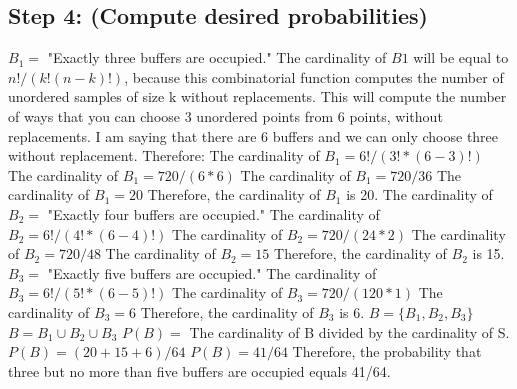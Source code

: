 \documentclass[a4paper,10pt]{article}
\begin{document}
\subsection{Step 4: (Compute desired probabilities)}
$ B_{1} = $ "Exactly three buffers are occupied." \newline
The cardinality of $ B{1} $ will be equal to $ n!/(k!(n-k)!) $, because this combinatorial function computes the 
number 
of unordered samples of size k without replacements. This will compute the number of ways that you can choose 3 
unordered points from 6 points, without replacements. I am saying that there are 6 buffers and we can only 
choose three without replacement. Therefore: \newline
The cardinality of $ B_{1} = 6!/(3!*(6-3)!) $ \newline
The cardinality of $ B_{1} = 720/(6*6) $ \newline
The cardinality of $ B_{1} = 720/36 $ \newline
The cardinality of $ B_{1} = 20 $ \newline
Therefore, the cardinality of $ B_{1} $ is 20. \newline \newline
The cardinality of $ B_{2} = $ "Exactly four buffers are occupied." \newline
The cardinality of $ B_{2} = 6!/(4!*(6-4)!) $ \newline
The cardinality of $ B_{2} = 720/(24*2) $ \newline
The cardinality of $ B_{2} = 720/48 $ \newline
The cardinality of $ B_{2} = 15 $ \newline
Therefore, the cardinality of $ B_{2} $ is 15. \newline \newline
$ B_{3} = $ "Exactly five buffers are occupied." \newline
The cardinality of $ B_{3} = 6!/(5!*(6-5)!) $ \newline
The cardinality of $ B_{3} = 720/(120*1) $
The cardinality of $ B_{3} = 6 $ \newline
Therefore, the cardinality of $ B_{3} $ is 6. \newline \newline
$ B = \{B_{1}, B_{2}, B_{3}\} $ \newline
$ B = B_{1} \cup B_{2} \cup B_{3} $ \newline
$ P(B) = $ The cardinality of B divided by the cardinality of S. \newline
$ P(B) = (20+15+6)/64 $ \newline
$ P(B) = 41 /64 $ \newline
Therefore, the probability that three but no more than five buffers are occupied equals 41/64.
\end{document}
